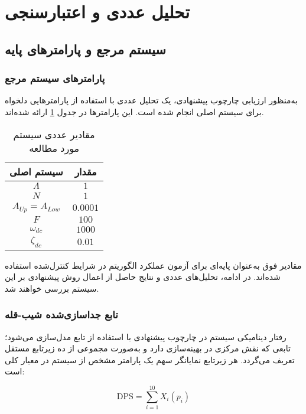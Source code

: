 \section{تحلیل عددی و اعتبارسنجی}

\subsection{سیستم مرجع و پارامترهای پایه}

\subsubsection{پارامترهای سیستم مرجع}

به‌منظور ارزیابی چارچوب پیشنهادی، یک تحلیل عددی با استفاده از پارامترهایی دلخواه برای سیستم اصلی انجام شده است. این پارامترها در جدول \ref{tab:main-system-parameters} ارائه شده‌اند.

\begin{table}[H]
\centering
\caption{ مقادیر عددی سیستم مورد مطالعه}
\label{tab:main-system-parameters}
\begin{tabular}{cc}
\hline
سیستم اصلی & مقدار \\
\hline
$\Lambda$ & $1$ \\
$N$ & $1$ \\
$A_{Up} = A_{Low}$ & $0.0001$ \\
$F$ & $100$ \\
$\omega_{dc}$ & $1000$ \\
$\zeta_{dc}$ & $0.01$ \\
\hline
\end{tabular}
\end{table}

مقادیر فوق به‌عنوان پایه‌ای برای آزمون عملکرد الگوریتم  در شرایط کنترل‌شده استفاده شده‌اند. در ادامه، تحلیل‌های عددی و نتایج حاصل از اعمال روش پیشنهادی بر این سیستم بررسی خواهند شد.


\subsubsection{تابع جداسازی‌شده شیب-قله}

رفتار دینامیکی سیستم در چارچوب پیشنهادی با استفاده از تابع  مدل‌سازی می‌شود؛ تابعی که نقش مرکزی در بهینه‌سازی دارد و به‌صورت مجموعی از ده زیرتابع مستقل تعریف می‌گردد. هر زیرتابع نمایانگر سهم یک پارامتر مشخص از سیستم در معیار کلی  است:

\begin{equation}
\mathrm{DPS} = \sum_{i=1}^{10} X_i(p_i)
\end{equation}

